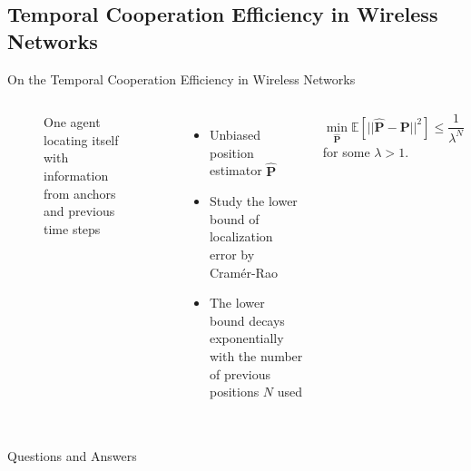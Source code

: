 \documentclass[notheorems]{beamer}
\begin{document}
\subsection{Temporal Cooperation Efficiency in Wireless Networks}
\begin{frame}{\large On the Temporal Cooperation Efficiency in Wireless Networks}
	\begin{columns}
		\begin{figure}
			\def\svgwidth{\textwidth}
			
			\caption{One agent locating itself with information from anchors and previous time steps}
			\label{f1}
		\end{figure}
		\begin{itemize}
			\item Unbiased position estimator $\hat{\bm{P}}$
			\item Study the lower bound of localization error by Cramér-Rao
			\item The lower bound decays exponentially
			with the number of previous positions $N$ used
		\end{itemize}
		$$
		\min_{\hat{\bm{P}}} \mathbb{E}[|| \hat{\bm{P}} - \bm{P} ||^2]
		\leq \frac{1}{\lambda^{N}}
		$$
	\hspace{0.8cm}	for some $\lambda > 1$.
	\end{columns}

\end{frame}

\begin{frame}
	\frametitle{}
	\begin{block}{}
	\centering
	{\Huge Questions and Answers}
	\end{block}
\end{frame}
\end{document}
